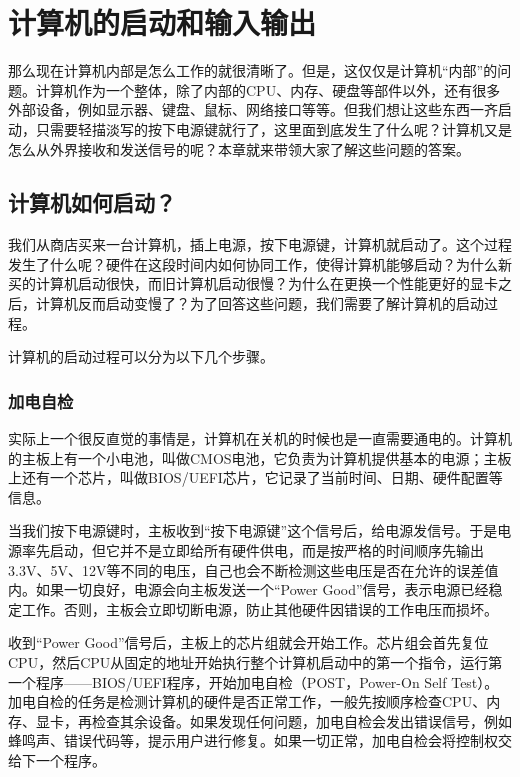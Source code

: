 \chapter{计算机的启动和输入输出}\label{chap:ics-3}

那么现在计算机内部是怎么工作的就很清晰了。但是，这仅仅是计算机“内部”的问题。计算机作为一个整体，除了内部的CPU、内存、硬盘等部件以外，还有很多外部设备，例如显示器、键盘、鼠标、网络接口等等。但我们想让这些东西一齐启动，只需要轻描淡写的按下电源键就行了，这里面到底发生了什么呢？计算机又是怎么从外界接收和发送信号的呢？本章就来带领大家了解这些问题的答案。

\section{计算机如何启动？}

我们从商店买来一台计算机，插上电源，按下电源键，计算机就启动了。这个过程发生了什么呢？硬件在这段时间内如何协同工作，使得计算机能够启动？为什么新买的计算机启动很快，而旧计算机启动很慢？为什么在更换一个性能更好的显卡之后，计算机反而启动变慢了？为了回答这些问题，我们需要了解计算机的启动过程。

计算机的启动过程可以分为以下几个步骤。

\subsection{加电自检}

实际上一个很反直觉的事情是，计算机在关机的时候也是一直需要通电的。计算机的主板上有一个小电池，叫做CMOS电池，它负责为计算机提供基本的电源；主板上还有一个芯片，叫做BIOS/UEFI芯片，它记录了当前时间、日期、硬件配置等信息。

当我们按下电源键时，主板收到“按下电源键”这个信号后，给电源发信号。于是电源率先启动，但它并不是立即给所有硬件供电，而是按严格的时间顺序先输出3.3V、5V、12V等不同的电压，自己也会不断检测这些电压是否在允许的误差值内。如果一切良好，电源会向主板发送一个“Power Good”信号，表示电源已经稳定工作。否则，主板会立即切断电源，防止其他硬件因错误的工作电压而损坏。

收到“Power Good”信号后，主板上的芯片组就会开始工作。芯片组会首先复位CPU，然后CPU从固定的地址开始执行整个计算机启动中的第一个指令，运行第一个程序——BIOS/UEFI程序，开始加电自检（POST，Power-On Self Test）。加电自检的任务是检测计算机的硬件是否正常工作，一般先按顺序检查CPU、内存、显卡，再检查其余设备。如果发现任何问题，加电自检会发出错误信号，例如蜂鸣声、错误代码等，提示用户进行修复。如果一切正常，加电自检会将控制权交给下一个程序。

